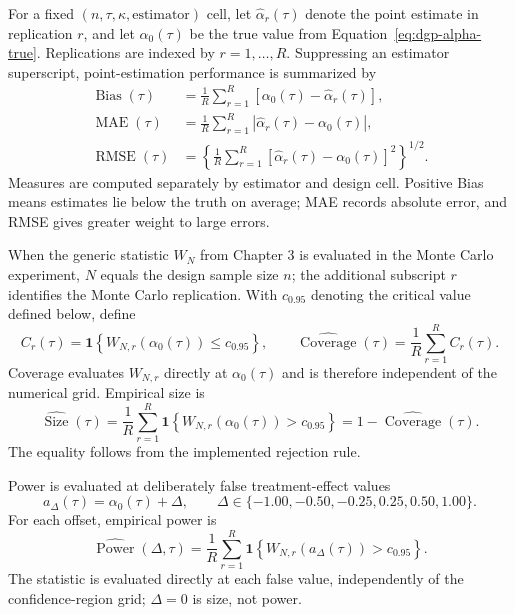 For a fixed $(n,\tau,\kappa,\text{estimator})$ cell, let $\widehat{\alpha}_r(\tau)$ denote the point estimate in replication $r$, and let $\alpha_0(\tau)$ be the true value from Equation~\eqref{eq:dgp-alpha-true}. Replications are indexed by $r=1,\ldots,R$. Suppressing an estimator superscript, point-estimation performance is summarized by
\begin{equation}
  \begin{aligned}
    \operatorname{Bias}(\tau)
      &=\frac{1}{R}\sum_{r=1}^{R}\left[\alpha_0(\tau)-\widehat{\alpha}_r(\tau)\right], \\
    \operatorname{MAE}(\tau)
      &=\frac{1}{R}\sum_{r=1}^{R}\left|\widehat{\alpha}_r(\tau)-\alpha_0(\tau)\right|, \\
    \operatorname{RMSE}(\tau)
      &=\left\{\frac{1}{R}\sum_{r=1}^{R}\left[\widehat{\alpha}_r(\tau)-\alpha_0(\tau)\right]^2\right\}^{1/2}.
  \end{aligned}
  \label{eq:performance-point}
\end{equation}
Measures are computed separately by estimator and design cell. Positive Bias means estimates lie below the truth on average; MAE records absolute error, and RMSE gives greater weight to large errors.

When the generic statistic $W_N$ from Chapter 3 is evaluated in the Monte Carlo experiment, $N$ equals the design sample size $n$; the additional subscript $r$ identifies the Monte Carlo replication. With $c_{0.95}$ denoting the critical value defined below, define
\begin{equation}
  C_r(\tau)
    =\mathbf{1}\!\left\{W_{N,r}\!\left(\alpha_0(\tau)\right)\leq c_{0.95}\right\},
  \qquad
  \widehat{\operatorname{Coverage}}(\tau)
    =\frac{1}{R}\sum_{r=1}^{R}C_r(\tau).
  \label{eq:performance-coverage}
\end{equation}
Coverage evaluates $W_{N,r}$ directly at $\alpha_0(\tau)$ and is therefore independent of the numerical grid. Empirical size is
\begin{equation}
  \widehat{\operatorname{Size}}(\tau)
    =\frac{1}{R}\sum_{r=1}^{R}
      \mathbf{1}\!\left\{W_{N,r}\!\left(\alpha_0(\tau)\right)>c_{0.95}\right\}
    =1-\widehat{\operatorname{Coverage}}(\tau).
  \label{eq:performance-size}
\end{equation}
The equality follows from the implemented rejection rule.

Power is evaluated at deliberately false treatment-effect values
\begin{equation}
  a_{\Delta}(\tau)=\alpha_0(\tau)+\Delta,
  \qquad
  \Delta\in\{-1.00,-0.50,-0.25,0.25,0.50,1.00\}.
  \label{eq:performance-alternatives}
\end{equation}
For each offset, empirical power is
\begin{equation}
  \widehat{\operatorname{Power}}(\Delta,\tau)
    =\frac{1}{R}\sum_{r=1}^{R}
      \mathbf{1}\!\left\{W_{N,r}\!\left(a_{\Delta}(\tau)\right)>c_{0.95}\right\}.
  \label{eq:performance-power}
\end{equation}
The statistic is evaluated directly at each false value, independently of the confidence-region grid; $\Delta=0$ is size, not power.

